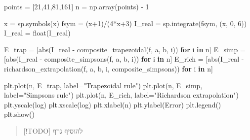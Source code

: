 \documentclass[
  a4paper,
]{article}
\newenvironment{Shaded}{}{}
\newcommand{\BuiltInTok}[1]{\textcolor[rgb]{0.00,0.50,0.00}{#1}}
\newcommand{\ControlFlowTok}[1]{\textcolor[rgb]{0.00,0.44,0.13}{\textbf{#1}}}
\newcommand{\DecValTok}[1]{\textcolor[rgb]{0.25,0.63,0.44}{#1}}
\newcommand{\KeywordTok}[1]{\textcolor[rgb]{0.00,0.44,0.13}{\textbf{#1}}}
\newcommand{\NormalTok}[1]{#1}
\newcommand{\OperatorTok}[1]{\textcolor[rgb]{0.40,0.40,0.40}{#1}}
\newcommand{\StringTok}[1]{\textcolor[rgb]{0.25,0.44,0.63}{#1}}
\begin{document}
\begin{Shaded}
\begin{Highlighting}[]
\NormalTok{points }\OperatorTok{=}\NormalTok{ [}\DecValTok{21}\NormalTok{,}\DecValTok{41}\NormalTok{,}\DecValTok{81}\NormalTok{,}\DecValTok{161}\NormalTok{]}
\NormalTok{n }\OperatorTok{=}\NormalTok{ np.array(points) }\OperatorTok{{-}} \DecValTok{1}

\NormalTok{x }\OperatorTok{=}\NormalTok{ sp.symbols(}\StringTok{\textquotesingle{}x\textquotesingle{}}\NormalTok{)}
\NormalTok{fsym }\OperatorTok{=}\NormalTok{ (x}\OperatorTok{+}\DecValTok{1}\NormalTok{)}\OperatorTok{/}\NormalTok{(}\DecValTok{4}\OperatorTok{*}\NormalTok{x}\OperatorTok{+}\DecValTok{3}\NormalTok{)}
\NormalTok{I\_real }\OperatorTok{=}\NormalTok{ sp.integrate(fsym, (x, }\DecValTok{0}\NormalTok{, }\DecValTok{6}\NormalTok{))}
\NormalTok{I\_real }\OperatorTok{=} \BuiltInTok{float}\NormalTok{(I\_real)}

\NormalTok{E\_trap }\OperatorTok{=}\NormalTok{ [}\BuiltInTok{abs}\NormalTok{(I\_real }\OperatorTok{{-}}\NormalTok{ composite\_trapezoidal(f, a, b, i)) }\ControlFlowTok{for}\NormalTok{ i }\KeywordTok{in}\NormalTok{ n]}
\NormalTok{E\_simp }\OperatorTok{=}\NormalTok{ [}\BuiltInTok{abs}\NormalTok{(I\_real }\OperatorTok{{-}}\NormalTok{ composite\_simpsons(f, a, b, i)) }\ControlFlowTok{for}\NormalTok{ i }\KeywordTok{in}\NormalTok{ n]}
\NormalTok{E\_rich }\OperatorTok{=}\NormalTok{ [}\BuiltInTok{abs}\NormalTok{(I\_real }\OperatorTok{{-}}\NormalTok{ richardson\_extrapolation(f, a, b, i, composite\_simpsons)) }\ControlFlowTok{for}\NormalTok{ i }\KeywordTok{in}\NormalTok{ n]}

\NormalTok{plt.plot(n, E\_trap, label}\OperatorTok{=}\StringTok{"Trapezoidal rule"}\NormalTok{)}
\NormalTok{plt.plot(n, E\_simp, label}\OperatorTok{=}\StringTok{"Simpson\textquotesingle{}s rule"}\NormalTok{)}
\NormalTok{plt.plot(n, E\_rich, label}\OperatorTok{=}\StringTok{"Richardson extrapolation"}\NormalTok{)}
\NormalTok{plt.yscale(}\StringTok{\textquotesingle{}log\textquotesingle{}}\NormalTok{)}
\NormalTok{plt.xscale(}\StringTok{\textquotesingle{}log\textquotesingle{}}\NormalTok{)}
\NormalTok{plt.xlabel(}\StringTok{\textquotesingle{}n\textquotesingle{}}\NormalTok{)}
\NormalTok{plt.ylabel(}\StringTok{\textquotesingle{}Error\textquotesingle{}}\NormalTok{)}
\NormalTok{plt.legend()}
\NormalTok{plt.show()}
\end{Highlighting}
\end{Shaded}

\begin{quote}
{[}!TODO{]} להוסיף גרף
\end{quote}
\end{document}
